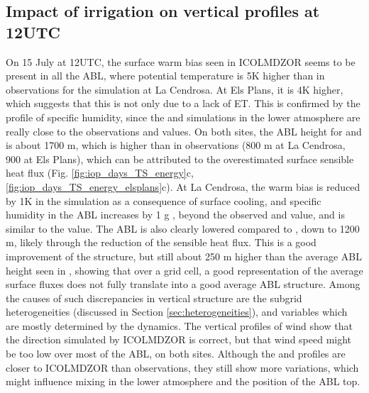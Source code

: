 \clearpage

\subsection{Impact of irrigation on vertical profiles at 12UTC}
\label{sec:vertical_profiles}

On 15 July at 12UTC, the surface warm bias seen in ICOLMDZOR seems to be present in all the ABL, where potential temperature is 5K higher than in observations for the \noirr simulation at La Cendrosa. At Els Plans, it is 4K higher, which suggests that this is not only due to a lack of ET. This is confirmed by the profile of specific humidity, since the \noirr and \irr simulations in the lower atmosphere are really close to the observations and \mesomean values.
On both sites, the ABL height for \noirr and \irr is about 1700 m, which is higher than in observations (800 m at La Cendrosa, 900 at Els Plans), which can be attributed to the overestimated surface sensible heat flux (Fig. \ref{fig:iop_days_TS_energy}c,  \ref{fig:iop_days_TS_energy_elsplans}c). 
At La Cendrosa, the warm bias is reduced by 1K in the \irrboost simulation as a consequence of surface cooling, and specific humidity in the ABL increases by 1 g \perkg, beyond the observed and \mesomean value, and is similar to the \mesoexact value. 
The ABL is also clearly lowered compared to \noirr, down to 1200 m, likely through the reduction of the sensible heat flux. This is a good improvement of the structure, but still about 250 m higher than the average ABL height seen in \mesomean, showing that over a grid cell, a good representation of the average surface fluxes does not fully translate into a good average ABL structure.
Among the causes of such discrepancies in vertical structure are the subgrid heterogeneities (discussed in Section \ref{sec:heterogeneities}), and variables which are mostly determined by the dynamics. The vertical profiles of wind show that the direction simulated by ICOLMDZOR is correct, but that wind speed might be too low over most of the ABL, on both sites. Although the \mesomean and \mesoexact profiles are closer to ICOLMDZOR than observations, they still show more variations, which might influence mixing in the lower atmosphere and the position of the ABL top. %

